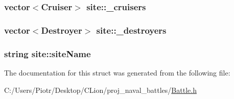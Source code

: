 \subsubsection[{\texorpdfstring{\+\_\+cruisers}{_cruisers}}]{\setlength{\rightskip}{0pt plus 5cm}vector$<${\bf Cruiser}$>$ site\+::\+\_\+cruisers}\hypertarget{structsite_ae2ae4dc2c4f396ead27233eb03e7756f}{}\label{structsite_ae2ae4dc2c4f396ead27233eb03e7756f}
\subsubsection[{\texorpdfstring{\+\_\+destroyers}{_destroyers}}]{\setlength{\rightskip}{0pt plus 5cm}vector$<${\bf Destroyer}$>$ site\+::\+\_\+destroyers}\hypertarget{structsite_af920c7e8cfc6306cde0d45b9850af20e}{}\label{structsite_af920c7e8cfc6306cde0d45b9850af20e}
\subsubsection[{\texorpdfstring{site\+Name}{siteName}}]{\setlength{\rightskip}{0pt plus 5cm}string site\+::site\+Name}\hypertarget{structsite_ae4192402457d29b056ec34ebc57b535e}{}\label{structsite_ae4192402457d29b056ec34ebc57b535e}


The documentation for this struct was generated from the following file\+:\begin{DoxyCompactItemize}
\item 
C\+:/\+Users/\+Piotr/\+Desktop/\+C\+Lion/proj\+\_\+naval\+\_\+battles/\hyperlink{_battle_8h}{Battle.\+h}\end{DoxyCompactItemize}
